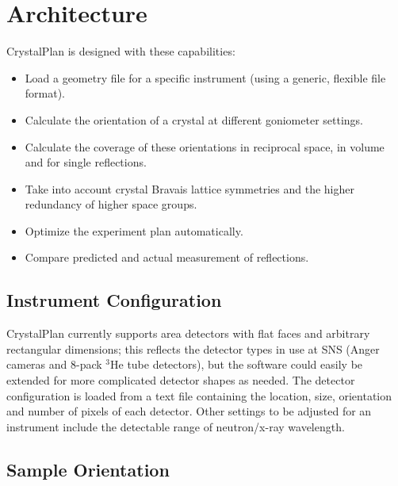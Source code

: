 \documentclass[final]{iucr}              %
\begin{document}
\section{Architecture}

CrystalPlan is designed with these capabilities:

\begin{itemize}
  \item Load a geometry file for a specific instrument (using a generic,
  flexible file format).
  \item Calculate the orientation of a crystal at different goniometer settings.
  \item Calculate the coverage of these orientations in reciprocal space,
  in volume and for single reflections.
  \item Take into account crystal Bravais lattice symmetries and the higher
  redundancy of higher space groups.
  \item Optimize the experiment plan automatically.
  \item Compare predicted and actual measurement of reflections.
\end{itemize}

\subsection{Instrument Configuration}

CrystalPlan currently supports area detectors with flat faces and arbitrary
rectangular dimensions; this reflects the detector types in use at SNS (Anger
cameras and 8-pack $^3$He tube detectors), but the software could easily be
extended for more complicated detector shapes as needed. The detector configuration is loaded from
a text file containing the location, size, orientation and number of pixels of
each detector. Other settings to be adjusted for an instrument include the
detectable range of neutron/x-ray wavelength.


\subsection{Sample Orientation}
\end{document}

